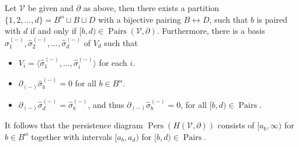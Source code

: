 \begin{theorem}
	{\cite[Theorem 2.6]{de2011dualities}} \label{persistencepartition} Let $\mathcal{V}$ be given and $\partial$ as above, then there
	exists a partition $\{1,2, \ldots, d\} = B^{\Join} \sqcup B \sqcup D$ with a bijective pairing $B \leftrightarrow D$, such that $b$ is paired with $d$ if and only if $[b,d) \in \operatorname{Pairs}(\mathcal{V}, \partial)$. Furthermore, there is a basis
	$\hat{\sigma}^{(-)}_{1}, \hat{\sigma}^{(-)}_{2}, \ldots, \hat{\sigma}^{(-)}_{d}$ of $V_{d}$ such
	that
	\begin{itemize}
		\item $V_{i} = \langle \hat{\sigma}^{(-)}_{1}, \ldots, \hat{\sigma}^{(-)}_{i} \rangle$ for
			each $i$.
		\item $\partial_{(-)}\hat{\sigma}^{(-)}_{b} = 0$ for all $b \in B^{\Join}$.
		\item $\partial_{(-)}\hat{\sigma}^{(-)}_{d} = \hat{\sigma}^{(-)}_{b}$, and thus
			$\partial_{(-)}\hat{\sigma}^{(-)}_{b} = 0$, for all $[b,d) \in \operatorname{Pairs}$.
	\end{itemize}
	It follows that the persistence diagram
	$\operatorname{Pers}(H(\mathcal{V},\partial))$ consists of $[a_{b}, \infty)$ for
	$b \in B^{\Join}$ together with intervals $[a_{b},a_{d})$ for
	$[b,d) \in \operatorname{Pairs}$.
\end{theorem}

